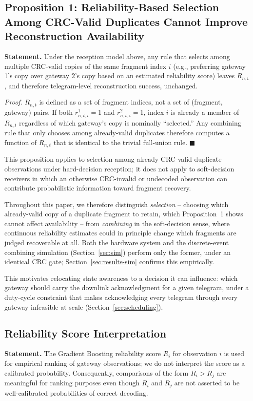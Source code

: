\documentclass[journal]{IEEEtran}
\begin{document}
\subsection{Proposition 1: Reliability-Based Selection Among CRC-Valid Duplicates Cannot Improve Reconstruction Availability}
\textbf{Statement.} Under the reception model above, any rule that selects among multiple CRC-valid copies of the same fragment index $i$ (e.g., preferring gateway 1's copy over gateway 2's copy based on an estimated reliability score) leaves $R_{n,t}$, and therefore telegram-level reconstruction success, unchanged.

\textit{Proof.} $R_{n,t}$ is defined as a set of fragment indices, not a set of (fragment, gateway) pairs. If both $r^1_{n,t,i} = 1$ and $r^2_{n,t,i} = 1$, index $i$ is already a member of $R_{n,t}$ regardless of which gateway's copy is nominally ``selected.'' Any combining rule that only chooses among already-valid duplicates therefore computes a function of $R_{n,t}$ that is identical to the trivial full-union rule. $\blacksquare$

This proposition applies to selection among already CRC-valid duplicate observations under hard-decision reception; it does not apply to soft-decision receivers in which an otherwise CRC-invalid or undecoded observation can contribute probabilistic information toward fragment recovery.

Throughout this paper, we therefore distinguish \emph{selection} -- choosing which already-valid copy of a duplicate fragment to retain, which Proposition~1 shows cannot affect availability -- from \emph{combining} in the soft-decision sense, where continuous reliability estimates could in principle change which fragments are judged recoverable at all. Both the hardware system and the discrete-event combining simulation (Section~\ref{sec:sim}) perform only the former, under an identical CRC gate; Section~\ref{sec:results-sim} confirms this empirically.

This motivates relocating state awareness to a decision it can influence: which gateway should carry the downlink acknowledgment for a given telegram, under a duty-cycle constraint that makes acknowledging every telegram through every gateway infeasible at scale (Section~\ref{sec:scheduling}).

\subsection{Reliability Score Interpretation}
\textbf{Statement.} The Gradient Boosting reliability score $R_i$ for observation $i$ is used for empirical ranking of gateway observations; we do not interpret the score as a calibrated probability. Consequently, comparisons of the form $R_i > R_j$ are meaningful for ranking purposes even though $R_i$ and $R_j$ are not asserted to be well-calibrated probabilities of correct decoding.
\end{document}
